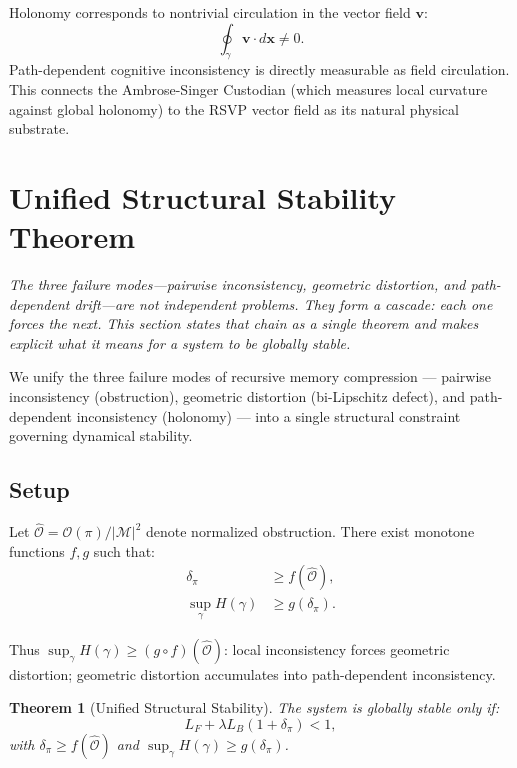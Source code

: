 \documentclass[12pt,a4paper]{article}
\newtheorem{theorem}{Theorem}[section]
\begin{document}
Holonomy corresponds to nontrivial circulation in the vector field $\mathbf{v}$:
\[
\oint_\gamma \mathbf{v} \cdot d\mathbf{x} \neq 0.
\]
Path-dependent cognitive inconsistency is directly measurable as field circulation. This connects the Ambrose-Singer Custodian (which measures local curvature against global holonomy) to the RSVP vector field as its natural physical substrate.

\section{Unified Structural Stability Theorem}
\label{sec:unified}

\textit{The three failure modes---pairwise inconsistency, geometric distortion, and path-dependent drift---are not independent problems. They form a cascade: each one forces the next. This section states that chain as a single theorem and makes explicit what it means for a system to be globally stable.}

We unify the three failure modes of recursive memory compression --- pairwise inconsistency (obstruction), geometric distortion (bi-Lipschitz defect), and path-dependent inconsistency (holonomy) --- into a single structural constraint governing dynamical stability.

\subsection{Setup}

Let $\hat{\mathcal{O}} = \mathcal{O}(\pi)/|\mathcal{M}|^2$ denote normalized obstruction. There exist monotone functions $f, g$ such that:
\begin{align}
\delta_\pi &\geq f(\hat{\mathcal{O}}), \\
\sup_{\gamma} H(\gamma) &\geq g(\delta_\pi).
\end{align}

Thus $\sup_\gamma H(\gamma) \geq (g \circ f)(\hat{\mathcal{O}})$: local inconsistency forces geometric distortion; geometric distortion accumulates into path-dependent inconsistency.

\begin{theorem}[Unified Structural Stability]
\label{thm:unified}
The system is globally stable only if:
\[
L_F + \lambda L_B (1 + \delta_\pi) < 1,
\]
with $\delta_\pi \geq f(\hat{\mathcal{O}})$ and $\sup_\gamma H(\gamma) \geq g(\delta_\pi)$.
\end{theorem}
\end{document}
